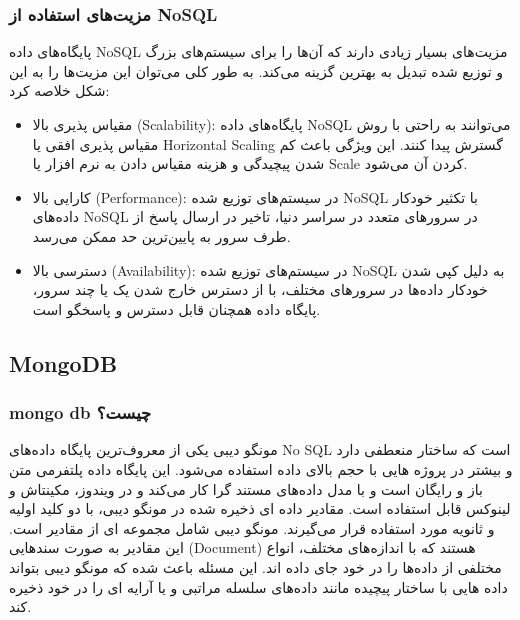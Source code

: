 \subsubsection{مزیت‌های استفاده از NoSQL}
پایگاه‌های داده NoSQL مزیت‌های بسیار زیادی دارند که آن‌ها را برای سیستم‌های بزرگ و توزیع شده تبدیل به بهترین گزینه می‌کند. به طور کلی می‌توان این مزیت‌ها را به این شکل خلاصه کرد:
\begin{itemize}
	\item
مقیاس پذیری بالا (Scalability): پایگاه‌های داده NoSQL می‌توانند به راحتی با روش مقیاس پذیری افقی یا Horizontal Scaling گسترش پیدا کنند. این ویژگی باعث کم شدن پیچیدگی و هزینه مقیاس دادن به نرم افزار یا Scale کردن آن می‌شود.
\item
کارایی بالا (Performance): در سیستم‌های توزیع شده NoSQL با تکثیر خودکار داده‌های NoSQL در سرورهای متعدد در سراسر دنیا، تاخیر در ارسال پاسخ از طرف سرور به پایین‌ترین حد ممکن می‌رسد.
\item
دسترسی بالا (Availability): در سیستم‌های توزیع شده NoSQL به دلیل کپی شدن خودکار داده‌ها در سرورهای مختلف، با از دسترس خارج شدن یک یا چند سرور، پایگاه داده همچنان قابل دسترس و پاسخگو است.
\end{itemize}

\subsection{MongoDB}
\subsubsection{mongo db چیست؟}
مونگو دیبی
 یکی از معروف‌ترین پایگاه داده‌های No SQL است که ساختار منعطفی دارد و بیشتر در پروژه هایی با حجم بالای داده استفاده می‌شود. این پایگاه داده پلتفرمی متن باز و رایگان است و با مدل داده‌های مستند گرا
 کار می‌کند و در ویندوز، مکینتاش و لینوکس قابل استفاده است. مقادیر داده ای ذخیره شده در مونگو دیبی، با دو کلید اولیه
 و ثانویه
  مورد استفاده قرار می‌گیرند.
مونگو دیبی شامل مجموعه ای از مقادیر است. این مقادیر به صورت سندهایی (Document) هستند که با اندازه‌های مختلف، انواع مختلفی از داده‌ها را در خود جای داده اند. این مسئله باعث شده که مونگو دیبی بتواند داده هایی با ساختار پیچیده مانند داده‌های سلسله مراتبی و یا آرایه ای را در خود ذخیره کند.

